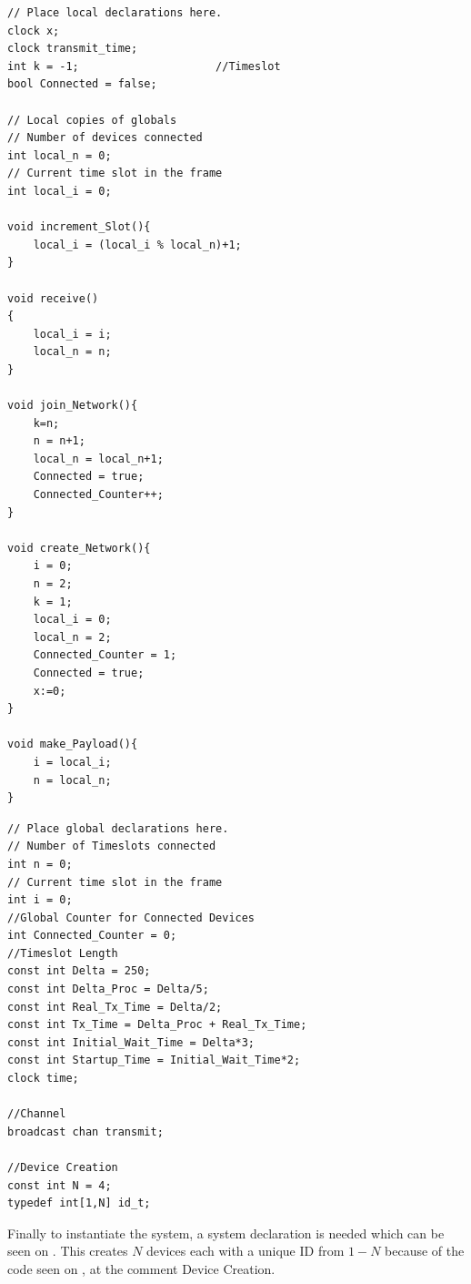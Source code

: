 \noindent\begin{minipage}{0.47\textwidth}
\begin{lstlisting}[style=UPPAAL,
caption={Local code for Device.}, label={device_local}]
// Place local declarations here.
clock x;
clock transmit_time;
int k = -1;                     //Timeslot
bool Connected = false;

// Local copies of globals
// Number of devices connected
int local_n = 0; 
// Current time slot in the frame
int local_i = 0;

void increment_Slot(){
    local_i = (local_i % local_n)+1;
}

void receive()
{
    local_i = i;
    local_n = n;
}

void join_Network(){
    k=n;
    n = n+1;
    local_n = local_n+1;
    Connected = true;
    Connected_Counter++;
}

void create_Network(){
    i = 0;
    n = 2;
    k = 1;
    local_i = 0;
    local_n = 2;
    Connected_Counter = 1;
    Connected = true;
    x:=0;
}

void make_Payload(){
    i = local_i;
    n = local_n;
}

\end{lstlisting}
\end{minipage}\hfill
\begin{minipage}{0.47\textwidth}
\begin{lstlisting}[style=UPPAAL,
caption={Code for the global declarations.}, label={uppaal_Global}]
// Place global declarations here.
// Number of Timeslots connected
int n = 0;         
// Current time slot in the frame
int i = 0;            
//Global Counter for Connected Devices                    
int Connected_Counter = 0;
//Timeslot Length
const int Delta = 250;                 
const int Delta_Proc = Delta/5;
const int Real_Tx_Time = Delta/2;
const int Tx_Time = Delta_Proc + Real_Tx_Time;
const int Initial_Wait_Time = Delta*3;
const int Startup_Time = Initial_Wait_Time*2;
clock time;

//Channel
broadcast chan transmit;

//Device Creation
const int N = 4;
typedef int[1,N] id_t;
\end{lstlisting}
\end{minipage}

Finally to instantiate the system, a system declaration is needed which can be seen on .
This creates $N$ devices each with a unique ID from $1 - N$ because of the code seen on , at the comment Device Creation.

